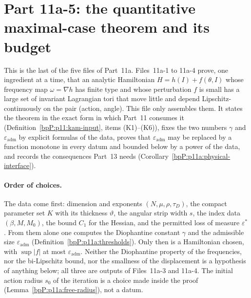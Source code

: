 \section{Part 11a-5: the quantitative maximal-case theorem and its budget}\label{bpP:p11a5}
\begingroup\sloppy

This is the last of the five files of Part~11a. Files~11a-1 to 11a-4 prove, one ingredient at a time, that an analytic Hamiltonian $H=h(I)+f(\theta,I)$ whose frequency map $\omega=\nabla h$ has finite type and whose perturbation $f$ is small has a large set of invariant Lagrangian tori that move little and depend Lipschitz-continuously on the pair (action, angle). This file only assembles them. It states the theorem in the exact form in which Part~11 consumes it (Definition~\ref{bpP:p11:kam-input}, items (K1)--(K6)), fixes the two numbers $\gamma$ and $\varepsilon_{\mathrm{adm}}$ by explicit formulas of the data, proves that $\varepsilon_{\mathrm{adm}}$ may be replaced by a function monotone in every datum and bounded below by a power of the data, and records the consequences Part~13 needs (Corollary~\ref{bpP:p11a:physical-interface}).

\paragraph{Order of choices.} The data come first: dimension and exponents $(N,\mu,\rho,\tau_D)$, the compact parameter set $K$ with its thickness $\vartheta$, the angular strip width $s$, the index data $(\beta,M,M_0)$, the bound $C_1$ for the Hessian, and the permitted loss of measure $\varepsilon^*$. From them alone one computes the Diophantine constant $\gamma$ and the admissible size $\varepsilon_{\mathrm{adm}}$ (Definition~\ref{bpP:p11a:thresholds}). Only then is a Hamiltonian chosen, with $\sup\lvert f\rvert$ at most $\varepsilon_{\mathrm{adm}}$. Neither the Diophantine property of the frequencies, nor the bi-Lipschitz bound, nor the smallness of the displacement is a hypothesis of anything below; all three are outputs of Files~11a-3 and 11a-4. The initial action radius $s_0$ of the iteration is a choice made inside the proof (Lemma~\ref{bpP:p11a:free-radius}), not a datum.

